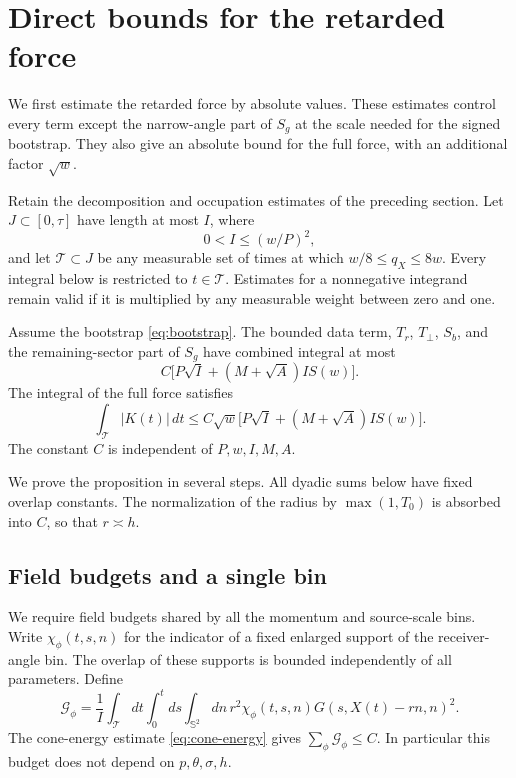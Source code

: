\section{Direct bounds for the retarded force}\label{sec:direct}

We first estimate the retarded force by absolute values.  These estimates
control every term except the narrow-angle part of $S_g$ at the scale
needed for the signed bootstrap.  They also give an absolute bound for
the full force, with an additional factor $\sqrt w$.

Retain the decomposition and occupation estimates of the preceding
section.  Let $J\subset[0,\tau]$ have length at most $I$, where
\begin{equation}\label{dir:time-range}
 0<I\le (w/P)^2,
\end{equation}
and let $\mathcal T\subset J$ be any measurable set of times at which
$w/8\le q_X\le8w$.  Every integral below is restricted to
$t\in\mathcal T$.  Estimates for a nonnegative integrand remain valid
if it is multiplied by any measurable weight between zero and one.

\begin{proposition}\label{dir:direct}
Assume the bootstrap \eqref{eq:bootstrap}.  The bounded data term,
$T_r$, $T_\perp$, $S_b$, and the remaining-sector part of $S_g$ have
combined integral at most
\begin{equation}\label{dir:baseline}
 C\bigl[P\sqrt I+(M+\sqrt A)I S(w)\bigr].
\end{equation}
The integral of the full force satisfies
\begin{equation}\label{dir:absolute}
 \int_{\mathcal T}|K(t)|\,dt
 \le C\sqrt w\bigl[P\sqrt I+(M+\sqrt A)I S(w)\bigr].
\end{equation}
The constant $C$ is independent of $P,w,I,M,A$.
\end{proposition}

We prove the proposition in several steps.  All dyadic sums below have
fixed overlap constants.  The normalization of the radius by
$\max(1,T_0)$ is absorbed into $C$, so that $r\asymp h$.

\subsection{Field budgets and a single bin}

We require field budgets shared by all the momentum and source-scale
bins.  Write $\chi_\phi(t,s,n)$ for the indicator of a fixed enlarged
support of the receiver-angle bin.  The overlap of these supports is
bounded independently of all parameters.  Define
\begin{equation}\label{dir:G-budget}
 \mathcal G_\phi
 =\frac1I\int_{\mathcal T}dt\int_0^t ds\int_{\mathbb S^2}dn\,
       r^2\chi_\phi(t,s,n)G(s,X(t)-rn,n)^2.
\end{equation}
The cone-energy estimate \eqref{eq:cone-energy} gives
$\sum_\phi\mathcal G_\phi\le C$.
In particular this budget does not depend on $p,\theta,\sigma,h$.

